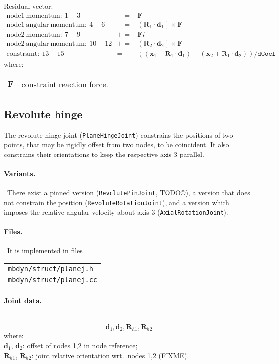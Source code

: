 \documentclass[10pt,dvips,fleqn,subeqn]{report}
\newcommand{\T}[1]{\bm{\mathbf{#1}}}
\begin{document}
\noindent
Residual vector:
\begin{eqnarray*}
	\mathrm{node1\ momentum}:\ 1-3& -= & \T F \\
	\mathrm{node1\ angular\ momentum}:\ 4-6& -= & 
		(\T R_1\cdot \T d_1) \times \T F \\
	\mathrm{node2\ momentum}:\ 7-9& += & \T Fi \\
	\mathrm{node2\ angular\ momentum}:\ 10-12& += & 
		(\T R_2\cdot \T d_2) \times \T F \\
	\mathrm{constraint}:\ 13-15& = &  ((\T x_1+\T R_1\cdot \T d_1) - 
			(\T x_2+\T R_1\cdot \T d_2))/\texttt{dCoef}
\end{eqnarray*}
where:

\noindent
\begin{tabular}{ll}
$\T{F}$ & constraint reaction force.
\end{tabular}



\subsection{Revolute hinge}
The revolute hinge joint (\texttt{PlaneHingeJoint}) constrains the positions 
of two points, that may be rigidly offset from two nodes, 
to be coincident.
It also constrains their orientations to keep the respective axis 3 
parallel.

\paragraph{Variants.} \
There exist a pinned version (\texttt{RevolutePinJoint}, TODO\copyright),
a version that does not constrain the position (\texttt{RevoluteRotationJoint}),
and a version which imposes the relative angular velocity about axis 3
(\texttt{AxialRotationJoint}).

\paragraph{Files.} \
It is implemented in files

\begin{tabular}{l}
\texttt{mbdyn/struct/planej.h} \\
\texttt{mbdyn/struct/planej.cc}
\end{tabular}

\paragraph{Joint data.} \
\begin{equation}
\T d_1, \T d_2, \T R_{h1}, \T R_{h2}
\end{equation}
where:\\
$\T d_1$, $\T d_2$: offset of nodes 1,2 in node reference;\\
$\T R_{h1}$, $\T R_{h2}$: joint relative orientation wrt.\ nodes 1,2 (FIXME).\\
\end{document}
